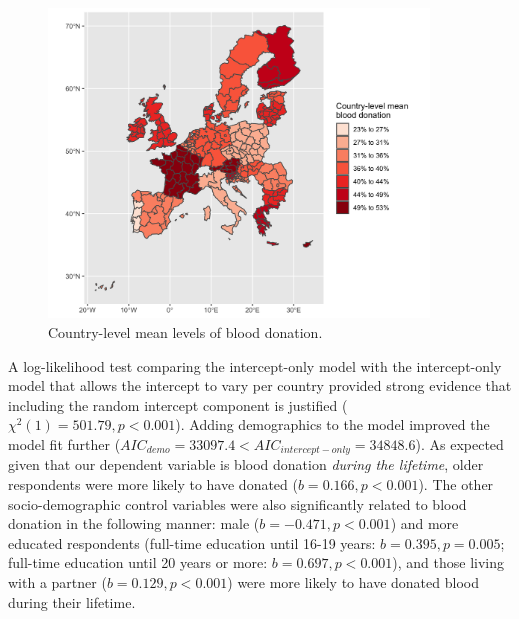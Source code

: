 \documentclass[AER]{AEA}
\begin{document}
\begin{figure}[h]
    \centering
    \includegraphics[width=0.9\textwidth]{images/map_BD.png}
    \caption{Country-level mean levels of blood donation.}
    \label{fig:map_BD}
\end{figure}


A log-likelihood test comparing the intercept-only model with the intercept-only model that allows the intercept to vary per country provided strong evidence that including the random intercept component is justified (${\chi}^2(1)=501.79, p < 0.001$). Adding demographics to the model improved the model fit further ($AIC_{demo} = 33097.4 < AIC_{intercept-only} = 34848.6$). As expected given that our dependent variable is blood donation \textit{during the lifetime}, older respondents were more likely to have donated ($b = 0.166, p < 0.001$). The other socio-demographic control variables were also significantly related to blood donation in the following manner: male ($b = -0.471, p < 0.001$) and more educated respondents (full-time education until 16-19 years: $b = 0.395, p = 0.005$; full-time education until 20 years or more: $b = 0.697, p < 0.001$), and those living with a partner ($b = 0.129, p < 0.001$) were more likely to have donated blood during their lifetime.
\end{document}
